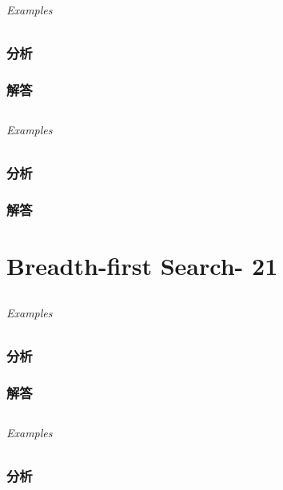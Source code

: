 \documentclass[UTF8,a4paper,12pt]{ctexbook}
\begin{document}
	\subparagraph{Examples}
	
	\subsection{分析}
	
	\subsection{解答}
	
\section{}
	
	\subparagraph{Examples}
	
	\subsection{分析}
	
	\subsection{解答}
\chapter{Breadth-first Search- 21}
\section{}
	
	\subparagraph{Examples}
	
	\subsection{分析}
	
	\subsection{解答}
	
\section{}
	
	\subparagraph{Examples}
	
	\subsection{分析}
	
\end{document}
